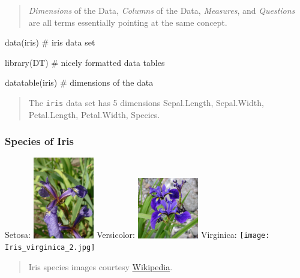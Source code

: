\documentclass[
]{article}
\newenvironment{Shaded}{}{}
\newcommand{\CommentTok}[1]{\textcolor[rgb]{0.00,0.50,0.00}{#1}}
\newcommand{\KeywordTok}[1]{\textcolor[rgb]{0.00,0.00,1.00}{#1}}
\newcommand{\NormalTok}[1]{#1}
\begin{document}
\begin{quote}
\emph{Dimensions} of the Data, \emph{Columns} of the Data,
\emph{Measures}, and \emph{Questions} are all terms essentially pointing
at the same concept.
\end{quote}

\begin{Shaded}
\begin{Highlighting}[]
\KeywordTok{data}\NormalTok{(iris) }\CommentTok{# iris data set}

\KeywordTok{library}\NormalTok{(DT) }\CommentTok{# nicely formatted data tables}

\KeywordTok{datatable}\NormalTok{(iris) }\CommentTok{# dimensions of the data}
\end{Highlighting}
\end{Shaded}

\hypertarget{htmlwidget-0e555e92e57b7fc5eafb}{}

\begin{quote}
The \texttt{iris} data set has 5 dimensions Sepal.Length, Sepal.Width,
Petal.Length, Petal.Width, Species.
\end{quote}

\hypertarget{species-of-iris}{%
\subsubsection{Species of Iris}\label{species-of-iris}}

Setosa:
\includegraphics[width=0.2\textwidth,height=\textheight]{Kosaciec_szczecinkowaty_Iris_setosa.jpg}
Versicolor:
\includegraphics[width=0.2\textwidth,height=\textheight]{Blue_Flag_Ottawa.jpg}
Virginica:
\texttt{[image: Iris\_virginica\_2.jpg]}

\begin{quote}
Iris species images courtesy
\href{https://www.wikipedia.org/}{Wikipedia}.
\end{quote}
\end{document}

